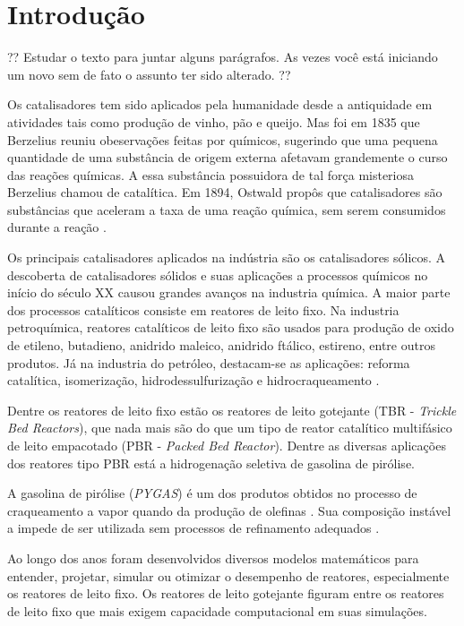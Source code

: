 %
% 
%
\chapter{Introdução} \label{chap:introducao}

?? Estudar o texto para juntar alguns parágrafos. As vezes você está iniciando
um novo sem de fato o assunto ter sido alterado. ??

Os catalisadores tem sido aplicados pela humanidade desde a antiquidade
em atividades tais como produção de vinho, pão e queijo. Mas foi em 1835 que
Berzelius reuniu obeservações feitas por químicos, sugerindo que uma pequena
quantidade de uma substância de origem externa afetavam grandemente o curso das
reações químicas. A essa substância possuidora de tal força misteriosa Berzelius
chamou de catalítica. Em 1894, Ostwald propôs que catalisadores são substâncias
que aceleram a taxa de uma reação química, sem serem consumidos durante a reação
\cite{Oyama1988}.

Os principais catalisadores aplicados na indústria são os catalisadores
sólicos. A descoberta de catalisadores sólidos e suas aplicações a processos
químicos no início do século XX causou grandes avanços na industria química. A
maior parte dos processos catalíticos consiste em reatores de leito fixo. Na
industria petroquímica, reatores catalíticos de leito fixo são usados para
produção de oxido de etileno, butadieno, anidrido maleico, anidrido ftálico,
estireno, entre outros produtos. Já na industria do petróleo, destacam-se as
aplicações: reforma catalítica, isomerização, hidrodessulfurização e
hidrocraqueamento \cite{Froment2011}.

Dentre os reatores de leito fixo estão os reatores de leito gotejante
(TBR - \emph{Trickle Bed Reactors}), que nada mais são do que um tipo de reator
catalítico multifásico de leito empacotado (PBR - \emph{Packed Bed Reactor}).
Dentre as diversas aplicações dos reatores tipo PBR está a hidrogenação
seletiva de gasolina de pirólise.

A gasolina de pirólise (\emph{PYGAS}) é um dos produtos obtidos no processo de
craqueamento a vapor quando da produção de olefinas \cite{Cheng1986}. Sua
composição instável a impede de ser utilizada sem processos de refinamento
adequados \cite{Derrien1986}.

Ao longo dos anos foram desenvolvidos diversos modelos matemáticos para
entender, projetar, simular ou otimizar o desempenho de reatores, especialmente
os reatores de leito fixo. Os reatores de leito gotejante figuram entre os
reatores de leito fixo que mais exigem capacidade computacional em suas
simulações. 

